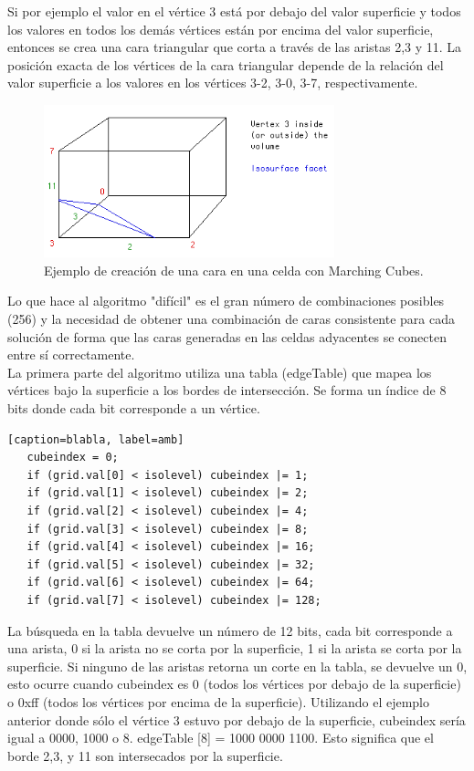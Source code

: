 \documentclass[12pt]{article}
\begin{document}
Si por ejemplo el valor en el vértice 3 está por debajo del valor superficie y todos los valores en todos los demás vértices están por encima del valor superficie, entonces se crea una cara triangular que corta a través de las aristas 2,3 y 11. La posición exacta de los vértices de la cara triangular depende de la relación del valor superficie a los valores en los vértices 3-2, 3-0, 3-7, respectivamente.
\begin{figure}[h!]
\includegraphics[width=0.75\textwidth,center]{marchingcubes2.png}
\caption{Ejemplo de creación de una cara en una celda con Marching Cubes.}
\end{figure}
Lo que hace al algoritmo "difícil" es el gran número de combinaciones posibles (256) y la necesidad de obtener una combinación de caras consistente para cada solución de forma que las caras generadas en las celdas adyacentes se conecten entre sí correctamente.\\
La primera parte del algoritmo utiliza una tabla (edgeTable) que mapea los vértices bajo la superficie a los bordes de intersección. Se forma un índice de 8 bits donde cada bit corresponde a un vértice.
\lstset{language=C}          %

\begin{lstlisting}[frame=single][caption=blabla, label=amb]
   cubeindex = 0;
   if (grid.val[0] < isolevel) cubeindex |= 1;
   if (grid.val[1] < isolevel) cubeindex |= 2;
   if (grid.val[2] < isolevel) cubeindex |= 4;
   if (grid.val[3] < isolevel) cubeindex |= 8;
   if (grid.val[4] < isolevel) cubeindex |= 16;
   if (grid.val[5] < isolevel) cubeindex |= 32;
   if (grid.val[6] < isolevel) cubeindex |= 64;
   if (grid.val[7] < isolevel) cubeindex |= 128;
\end{lstlisting}

La búsqueda en la tabla devuelve un número de 12 bits, cada bit corresponde a una arista, 0 si la arista no se corta por la superficie, 1 si la arista se corta por la superficie. Si ninguno de las aristas retorna un corte en la tabla, se devuelve un 0, esto ocurre cuando cubeindex es 0 (todos los vértices por debajo de la superficie) o 0xff (todos los vértices por encima de la superficie).
Utilizando el ejemplo anterior donde sólo el vértice 3 estuvo por debajo de la superficie, cubeindex sería igual a 0000, 1000 o 8. edgeTable [8] = 1000 0000 1100. Esto significa que el borde 2,3, y 11 son intersecados por la superficie.
\end{document}
